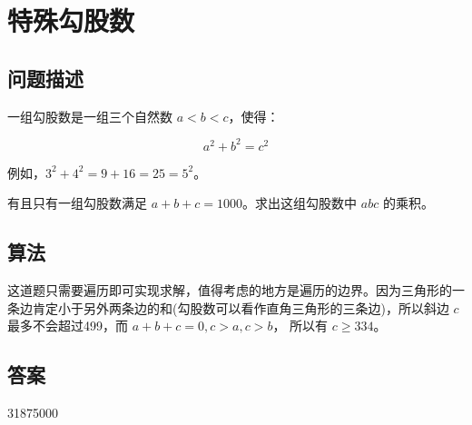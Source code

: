 \section{特殊勾股数}\label{sec:problem09}
\subsection{问题描述}
\begin{tcolorbox}
	一组勾股数是一组三个自然数 \( a < b < c \)，使得：

	\[
		a^2 + b^2 = c^2
	\]

	例如，\( 3^2 + 4^2 = 9 + 16 = 25 = 5^2 \)。

	有且只有一组勾股数满足 \( a + b + c = 1000 \)。求出这组勾股数中 \( abc \) 的乘积。
\end{tcolorbox}

\subsection{算法}
这道题只需要遍历即可实现求解，值得考虑的地方是遍历的边界。因为三角形的一条边肯定小于另外两条边的和(勾股数可以看作直角三角形的三条边)，所以斜边
\( c \) 最多不会超过499，而 \( a + b + c = 0, c > a, c > b \)， 所以有 \( c \geqslant 334 \)。

\subsection{答案}
31875000
